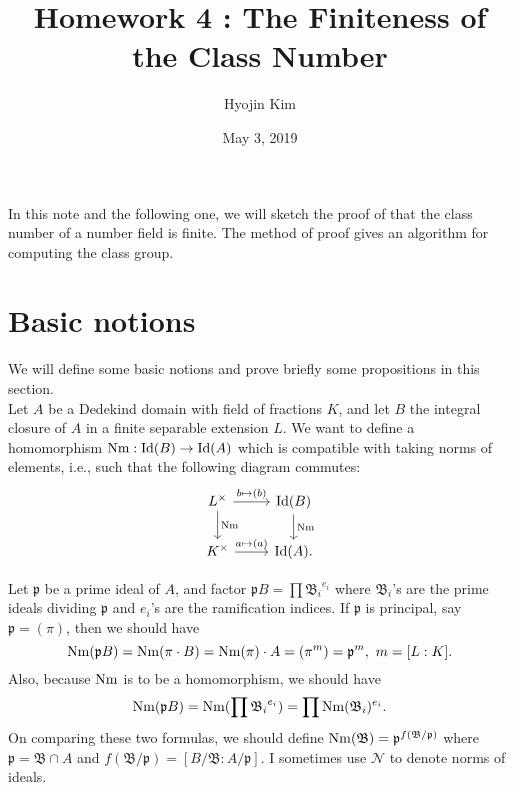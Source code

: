 \documentclass[11pt,a4paper,reqno]{amsart}
\numberwithin{equation}{section}
\begin{document}
 


\title{Homework 4 : The Finiteness of the Class Number} 
\author{Hyojin Kim} 
\date{May 3, 2019} 
\maketitle 

In this note and the following one, we will sketch the proof of that the class number of a number field is finite. 
 The method of proof gives an algorithm for computing the class group. 

\section{Basic notions} 
We will define some basic notions and prove briefly some propositions in this section.\\

Let $A$ be a Dedekind domain with field of fractions $K$,
 and let $B$ the integral closure of $A$ in a finite separable extension $L$.
 We want to define a homomorphism ${\rm Nm}:{\rm Id}(B)\rightarrow {\rm Id}(A)$
 which is compatible with taking norms of elements, i.e., such that the following diagram commutes:\
\begin{equation}\label{diagram}
\begin{tikzcd}
L^{\times} \arrow[r, "b \mapsto (b)"] \arrow[d, "{\rm Nm}"] 
& {\rm Id}(B) \arrow[d, "{\rm Nm}"] \\
K^{\times} \arrow[r, "a \mapsto (a)"]
& {\rm Id}(A).
\end{tikzcd}
\end{equation}

Let $\mathfrak{p}$ be a prime ideal of $A$,
 and factor $\mathfrak{p}B=\prod{{\mathfrak{B}_i}^{e_i}}$
 where $\mathfrak{B}_i$'s are the prime ideals dividing $\mathfrak{p}$
 and $e_i$'s are the ramification indices.
 If $\mathfrak{p}$ is principal, say $\mathfrak{p}=(\pi)$,
 then we should have
\[
{\rm Nm}(\mathfrak{p}B)={\rm Nm}(\pi \cdot B)={\rm Nm}(\pi)\cdot A = (\pi^m)=\mathfrak{p}^m,~m=[L:K].
\]
Also, because ${\rm Nm}$ is to be a homomorphism, we should have
\[
{\rm Nm}(\mathfrak{p}B)={\rm Nm}(\prod{{\mathfrak{B}_i}^{e_i}})=\prod {\rm Nm}({\mathfrak{B}_i})^{e_i}.
\]
On comparing these two formulas, we should define ${\rm Nm}(\mathfrak{B})=\mathfrak{p}^{f(\mathfrak{B}/\mathfrak{p})}$
 where $\mathfrak{p}=\mathfrak{B} \cap A$ and
 $f(\mathfrak{B}/\mathfrak{p})=[B/\mathfrak{B} : A/\mathfrak{p}]$. I sometimes use $\mathcal{N}$ to denote norms of ideals.
\end{document}
